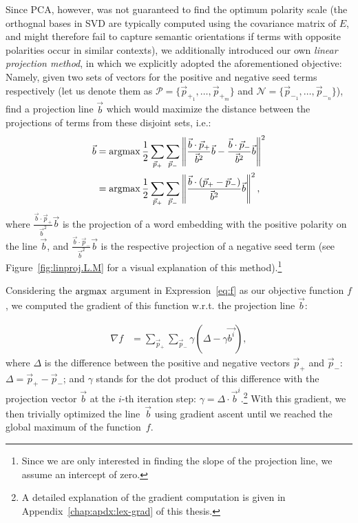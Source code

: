 Since PCA, however, was not guaranteed to find the optimum polarity
scale (the orthognal bases in SVD are typically computed using the
covariance matrix of $E$, and might therefore fail to capture semantic
orientations if terms with opposite polarities occur in similar
contexts), we additionally introduced our own \emph{linear projection
  method}, in which we explicitly adopted the aforementioned
objective: Namely, given two sets of vectors for the positive and
negative seed terms respectively (let us denote them as
$\mathcal{P} = \{\vec{p}_{+_1},\ldots,\vec{p}_{+_m}\}$ and
$\mathcal{N} = \{\vec{p}_{-_1},\ldots,\vec{p}_{-_n}\}$), find a
projection line $\vec{b}$ which would maximize the distance between
the projections of terms from these disjoint sets, i.e.: {\small%
\begin{align}
  \small
  \vec{b} &=\argmax\frac{1}{2}\sum_{\vec{p}_+}\sum_{\vec{p}_-}%
  \left\lVert\frac{\vec{b}\cdot\vec{p}_+}{\vec{b}^2}\vec{b}%
  - \frac{\vec{b}\cdot\vec{p}_-}{\vec{b}^2}\vec{b}\right\rVert^2\\
  &=\argmax\frac{1}{2}\sum_{\vec{p}_+}\sum_{\vec{p}_-}\left\lVert\frac{\vec{b}%
    \cdot\left(\vec{p}_{+}-\vec{p}_{-}\right)}{\vec{b}^2}\vec{b}\right\rVert^2,\label{eq:f}%
\end{align}\normalsize}%
where $\frac{\vec{b}\cdot\vec{p}_+}{\vec{b}^2}\vec{b}$ is the
projection of a word embedding with the positive polarity on the line
$\vec{b}$, and $\frac{\vec{b}\cdot\vec{p}_-}{\vec{b}^2}\vec{b}$ is the
respective projection of a negative seed term (see
Figure~\ref{fig:linproj.L.M} for a visual explanation of this
method).\footnote{Since we are only interested in finding the slope of
  the projection line, we assume an intercept of zero.}

Considering the $\argmax$ argument in Expression~\ref{eq:f} as our
objective function $f$, we computed the gradient of this function
w.r.t. the projection line $\vec{b}$:

{\small%
  \begin{align}
    \nabla f &= \sum_{\vec{p}_+}\sum_{\vec{p}_-}%
    \gamma\left(\Delta - \gamma\vec{b^{i}}\right),\label{eq:prj-line-grad}%
\end{align}\normalsize}%
where $\Delta$ is the difference between the positive and negative
vectors $\vec{p}_{+}$ and $\vec{p}_{-}$:
$\Delta = \vec{p}_{+}-\vec{p}_{-}$; and $\gamma$ stands for the dot
product of this difference with the projection vector $\vec{b}$ at the
$i$-th iteration step: $\gamma = \Delta \cdot \vec{b}^i$.\footnote{A
  detailed explanation of the gradient computation is given in
  Appendix~\ref{chap:apdx:lex-grad} of this thesis.}  With this
gradient, we then trivially optimized the line~$\vec{b}$ using
gradient ascent until we reached the global maximum of the
function~$f$.

